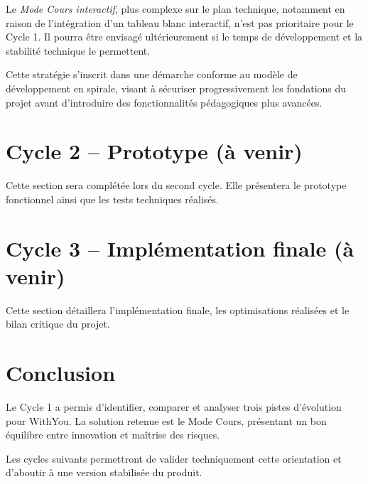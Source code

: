 \documentclass[12pt,a4paper]{report}
\begin{document}
Le \textit{Mode Cours interactif}, plus complexe sur le plan technique, notamment
en raison de l’intégration d’un tableau blanc interactif, n’est pas prioritaire
pour le Cycle 1.
Il pourra être envisagé ultérieurement si le temps de développement et la
stabilité technique le permettent.

Cette stratégie s’inscrit dans une démarche conforme au modèle de développement
en spirale, visant à sécuriser progressivement les fondations du projet avant
d’introduire des fonctionnalités pédagogiques plus avancées.

\chapter{Cycle 2 – Prototype (à venir)}
Cette section sera complétée lors du second cycle. 
Elle présentera le prototype fonctionnel ainsi que les tests techniques réalisés.

\chapter{Cycle 3 – Implémentation finale (à venir)}
Cette section détaillera l’implémentation finale, les optimisations réalisées et le bilan critique du projet.

\chapter{Conclusion}

Le Cycle 1 a permis d’identifier, comparer et analyser trois pistes d’évolution pour WithYou. 
La solution retenue est le Mode Cours, présentant un bon équilibre entre innovation et maîtrise des risques.

Les cycles suivants permettront de valider techniquement cette orientation et d’aboutir à une version stabilisée du produit.
\end{document}
